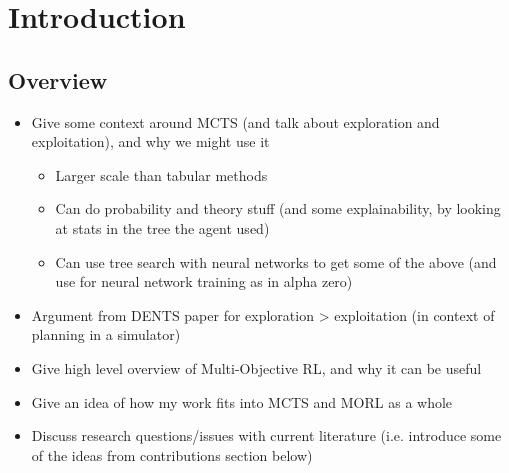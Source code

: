 

\chapter{\label{ch:1-intro}Introduction} 

    \minitoc


\section{Overview}
\label{sec:1-1-overview}

    \begin{itemize}
        \item Give some context around MCTS (and talk about exploration and exploitation), and why we might use it
        \begin{itemize}
            \item Larger scale than tabular methods
            \item Can do probability and theory stuff (and some explainability, by looking at stats in the tree the agent used)
            \item Can use tree search with neural networks to get some of the above (and use for neural network training as in alpha zero)
        \end{itemize}
        \item Argument from DENTS paper for exploration > exploitation (in context of planning in a simulator)
        \item Give high level overview of Multi-Objective RL, and why it can be useful
        \item Give an idea of how my work fits into MCTS and MORL as a whole
        \item Discuss research questions/issues with current literature (i.e. introduce some of the ideas from contributions section below)
    \end{itemize}


